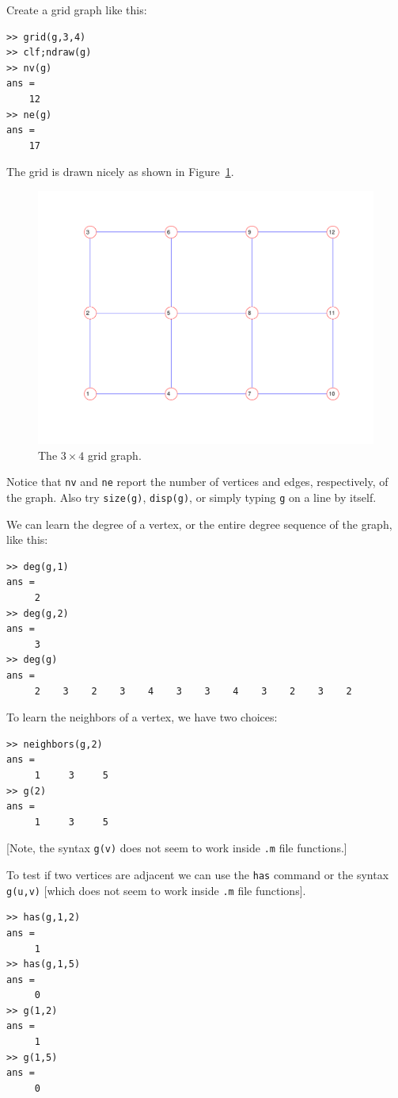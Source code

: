 \documentclass[12pt]{amsart}
\begin{document}
Create a grid graph like this:
\begin{verbatim}
>> grid(g,3,4)
>> clf;ndraw(g)
>> nv(g)
ans =
    12
>> ne(g)
ans =
    17
\end{verbatim}
The grid is drawn nicely as shown in Figure~\ref{fig:grid34}.
\begin{figure}[ht]
  \includegraphics[scale=0.5]{figs/grid34}
  \caption{The $3\times4$ grid graph.}
  \label{fig:grid34}
\end{figure}
Notice that \verb|nv| and \verb|ne| report the number of vertices and
edges, respectively, of the graph. Also try \verb|size(g)|,
\verb|disp(g)|, or simply typing \verb|g| on a line by itself.

We can learn the degree of a vertex, or the entire degree sequence of
the graph, like this:
\begin{verbatim}
>> deg(g,1)
ans =
     2
>> deg(g,2)
ans =
     3
>> deg(g)
ans =
     2    3    2    3    4    3    3    4    3    2    3    2
\end{verbatim}
To learn the neighbors of a vertex, we have two choices:
\begin{verbatim}
>> neighbors(g,2)
ans =
     1     3     5
>> g(2)
ans =
     1     3     5
\end{verbatim}
[Note, the syntax \verb|g(v)| does not seem to work inside \verb|.m|
file functions.]

To test if two vertices are adjacent we can use the \verb|has| command
or the syntax \verb|g(u,v)| [which does not seem to work inside
\verb|.m| file functions]. 
\begin{verbatim}
>> has(g,1,2)
ans =
     1
>> has(g,1,5)
ans =
     0
>> g(1,2)
ans =
     1
>> g(1,5)
ans =
     0
\end{verbatim}
\end{document}
